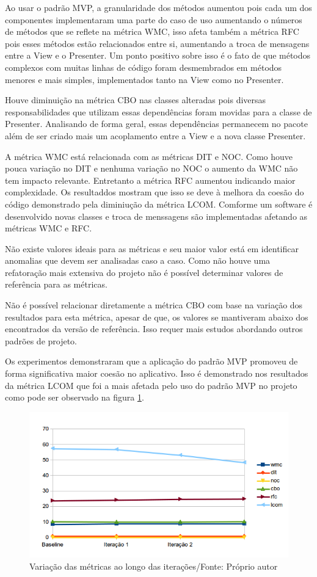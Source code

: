 Ao usar o padrão MVP, a granularidade dos métodos aumentou pois cada um dos
componentes implementaram uma parte do caso de uso aumentando o números de
métodos que se reflete na métrica WMC, isso afeta também a métrica RFC pois
esses métodos estão relacionados entre si, aumentando a troca de mensagens entre
a View e o Presenter. Um ponto positivo sobre isso é o fato de que métodos 
complexos com muitas linhas de código foram desmembrados em métodos menores e
mais simples, implementados tanto na View como no Presenter.

Houve diminuição na métrica CBO nas classes alteradas pois diversas
responsabilidades que utilizam essas dependências foram movidas para a classe de
Presenter. Analisando de forma geral, essas dependências permanecem no pacote
além de ser criado mais um acoplamento entre a View e a nova classe Presenter.

A métrica WMC está relacionada com as métricas DIT e NOC. Como houve pouca
variação no DIT e nenhuma variação no NOC o aumento da WMC não tem impacto
relevante. Entretanto a métrica RFC aumentou indicando maior complexidade. Os
resultaddos mostram que isso se deve à melhora da coesão do código demonstrado pela
diminiução da métrica LCOM. Comforme um software é desenvolvido novas classes e
troca de menssagens são implementadas afetando as métricas WMC e RFC. 

Não existe valores ideais para as métricas e seu maior valor está em identificar
anomalias que devem ser analisadas caso a caso. Como não houve uma refatoração
mais extensiva do projeto não é possível determinar valores de referência para
as métricas. 

Não é possível relacionar diretamente a métrica CBO com base na
variação dos resultados para esta métrica, apesar de que, os valores se
mantiveram abaixo dos encontrados da versão de referência.
Isso requer mais estudos abordando outros padrões de projeto. 

Os experimentos demonstraram que a aplicação do padrão MVP promoveu de forma
significativa maior coesão no aplicativo. Isso é demonstrado nos resultados da
métrica LCOM que foi a mais afetada pelo uso do padrão MVP no projeto como pode
ser observado na figura \ref{fig:allmetrics}.

\begin{figure}[!h]
	\centering
	\includegraphics{img/allmetrics}
	\caption{Variação das métricas ao longo das iterações/Fonte: Próprio autor}
	\label{fig:allmetrics}
\end{figure}


